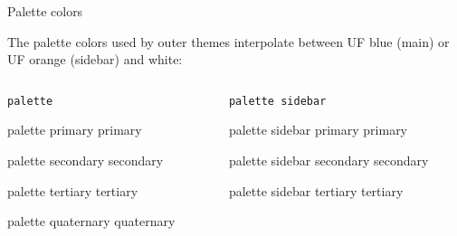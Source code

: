 \documentclass{beamer}
\begin{document}
\begin{frame}[fragile]{Palette colors}

The palette colors used by outer themes interpolate between UF blue (main) or UF orange (sidebar) and white:

\vfill

\begin{columns}
\begin{column}{.5\textwidth}

\centering
\verb|palette|
\vspace{1ex}

\begin{beamercolorbox}[sep=4pt,center]{palette primary}
primary
\end{beamercolorbox}

\begin{beamercolorbox}[sep=4pt,center]{palette secondary}
secondary
\end{beamercolorbox}

\begin{beamercolorbox}[sep=4pt,center]{palette tertiary}
tertiary
\end{beamercolorbox}

\begin{beamercolorbox}[sep=4pt,center]{palette quaternary}
quaternary
\end{beamercolorbox}

\end{column}
\begin{column}{.5\textwidth}

\centering
\verb|palette sidebar|
\vspace{1ex}

\begin{beamercolorbox}[sep=4pt,center]{palette sidebar primary}
primary
\end{beamercolorbox}

\begin{beamercolorbox}[sep=4pt,center]{palette sidebar secondary}
secondary
\end{beamercolorbox}

\begin{beamercolorbox}[sep=4pt,center]{palette sidebar tertiary}
tertiary
\end{beamercolorbox}


\end{column}
\end{columns}
\end{frame}
\end{document}
